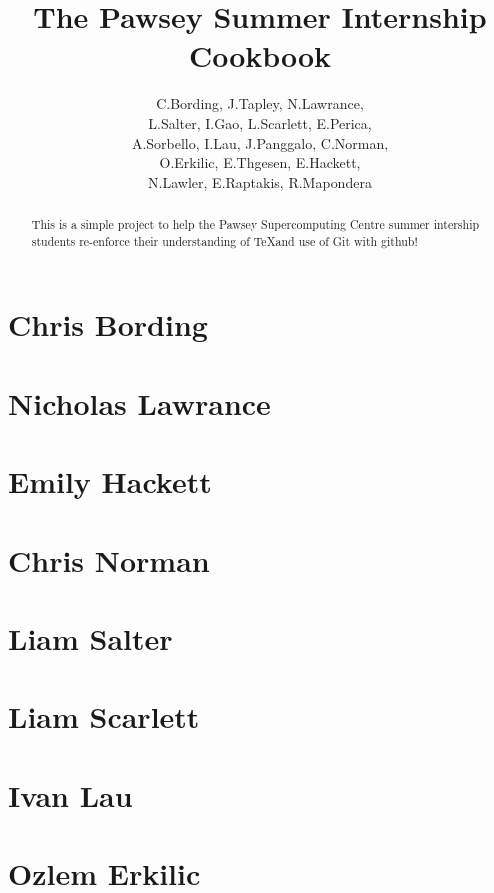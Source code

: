 \documentclass[11pt,a4paper]{report}
\title{The Pawsey Summer Internship Cookbook}
\author{C.Bording, J.Tapley, N.Lawrance,\\
L.Salter, I.Gao, L.Scarlett, E.Perica,\\
A.Sorbello, I.Lau, J.Panggalo, C.Norman,\\
O.Erkilic, E.Thgesen, E.Hackett,\\
N.Lawler, E.Raptakis, R.Mapondera}
\begin{document}
\maketitle
\tableofcontents


\begin{abstract}

This is a simple project to help the Pawsey Supercomputing Centre summer intership students re-enforce their understanding of \TeX and use of Git with github!

\end{abstract}

\chapter{Chris Bording}




\chapter{Nicholas Lawrance}


\chapter{Emily Hackett}


\chapter{Chris Norman}

\chapter{Liam Salter}


\chapter{Liam Scarlett}


\chapter{Ivan Lau}


\chapter{Ozlem Erkilic}

\end{document}
